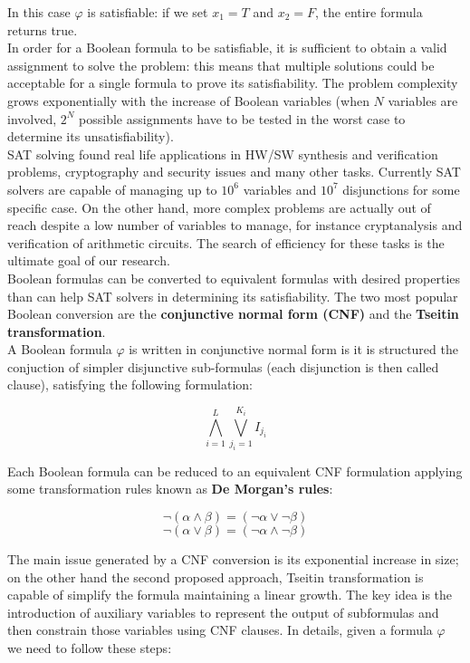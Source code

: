 In this case $\varphi$ is satisfiable: if we set $x_1 = T$ and $x_2 = F$, the entire formula returns true. \\
In order for a Boolean formula to be satisfiable, it is sufficient to obtain a valid assignment to solve the problem: this means that multiple solutions could be acceptable for a single formula to prove its satisfiability. The problem complexity grows exponentially with the increase of Boolean variables (when $N$ variables are involved, $2^N$ possible assignments have to be tested in the worst case to determine its unsatisfiability). \\
SAT solving found real life applications in HW/SW synthesis and verification problems, cryptography and security issues and many other tasks. Currently SAT solvers are capable of managing up to $10^6$ variables and $10^7$ disjunctions for some specific case. On the other hand, more complex problems are actually out of reach despite a low number of variables to manage, for instance cryptanalysis and verification of arithmetic circuits. The search of efficiency for these tasks is the ultimate goal of our research. \\
Boolean formulas can be converted to equivalent formulas with desired properties than can help SAT solvers in determining its satisfiability. The two most popular Boolean conversion are the \textbf{conjunctive normal form (CNF)} and the \textbf{Tseitin transformation}. \\
A Boolean formula $\varphi$ is written in conjunctive normal form is it is structured the conjuction of simpler disjunctive sub-formulas (each disjunction is then called clause), satisfying the following formulation:

\begin{equation}
    \bigwedge_{i=1}^L \bigvee_{j_i=1}^{K_i} I_{j_i}
\end{equation}

Each Boolean formula can be reduced to an equivalent CNF formulation applying some transformation rules known as \textbf{De Morgan's rules}:

\begin{equation}
    \neg (\alpha \wedge \beta) = (\neg \alpha \vee \neg \beta)
\end{equation}
\begin{equation}
    \neg (\alpha \vee \beta) = (\neg \alpha \wedge \neg \beta)
\end{equation}

The main issue generated by a CNF conversion is its exponential increase in size; on the other hand the second proposed approach, Tseitin transformation is capable of simplify the formula maintaining a linear growth. The key idea is the introduction of auxiliary variables to represent the output of subformulas
and then constrain those variables using CNF clauses. In details, given a formula $\varphi$ we need to follow these steps:

